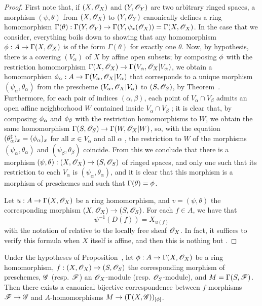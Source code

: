 \begin{proof}
First note that, if $(X,\mathscr{O}_X)$ and $(Y,\mathscr{O}_Y)$ are two arbitrary ringed spaces,
a morphism $(\psi,\theta)$ from $(X,\mathscr{O}_X)$ to $(Y,\mathscr{O}_Y)$ canonically defines a ring homomorphism $\Gamma(\theta):\Gamma(Y,\OO_Y)\to\Gamma(Y,\psi_*(\OO_X))=\Gamma(X,\OO_X)$.
In the case that we consider, everything boils down to showing that any homomorphism $\vphi:A\to\Gamma(X,\OO_X)$ is of the form $\Gamma(\theta)$ for exactly one $\theta$.
Now, by hypothesis, there is a covering $(V_\alpha)$ of $X$ by affine open subsets;
by composing $\phi$ with the restriction homomorphism $\Gamma(X,\OO_X)\to\Gamma(V_\alpha,\OO_X|V_\alpha)$, we obtain a homomorphism $\vphi_\alpha:A\to\Gamma(V_\alpha,\OO_X|V_\alpha)$ that corresponds to a unique morphism $(\psi_\alpha,\theta_\alpha)$ from the prescheme $(V_\alpha,\mathscr{O}_X|V_\alpha)$ to $(S,\mathscr{O}_S)$, by Theorem~.
Furthermore, for each pair of indices $(\alpha,\beta)$, each point of $V_\alpha\cap V_\beta$ admits an open affine neighborhood $W$ contained inside $V_\alpha\cap V_\beta$ ;
it is clear that, by composing $\phi_\alpha$ and $\phi_\beta$ with the restriction homomorphisms to $W$, we obtain the same homomorphism $\Gamma(S,\OO_S)\to\Gamma(W,\OO_X|W)$, so, with the equation $(\theta_\alpha^\sharp)_x=(\phi_\alpha)_x$ for all $x\in V_\alpha$ and all $\alpha$ , the restriction to $W$ of the morphisms $(\psi_\alpha,\theta_\alpha)$ and $(\psi_\beta,\theta_\beta)$ coincide.
From this we conclude that there is a morphism $(\psi,\theta):(X,\OO_X)\to(S,\OO_S)$ of ringed spaces, and only one such that its restriction to each $V_\alpha$ is $(\psi_\alpha,\theta_\alpha)$, and it is clear that this morphism is a morphism of preschemes and such that $\Gamma(\theta)=\phi$.

Let $u:A\to\Gamma(X,\OO_X)$ be a ring homomorphism, and $v=(\psi,\theta)$ the corresponding morphism $(X,\OO_X)\to(S,\OO_S)$.
For each $f\in A$, we have that
\begin{equation*}
  \label{1.2.2.4.1}
  \psi^{-1}(D(f))=X_{u(f)}
  \tag{2.2.4.1}
\end{equation*}
with the notation of  relative to the locally free sheaf $\mathscr{O}_X$.
In fact, it suffices to verify this formula when $X$ itself is affine, and then this is nothing but .
\end{proof}

\begin{prop}[2.2.5]
\label{1.2.2.5}
Under the hypotheses of Proposition~, let $\vphi:A\to\Gamma(X,\OO_X)$ be a ring homomorphism, $f:(X,\OO_X)\to(S,\OO_S)$ the corresponding morphism of preschemes, $\mathscr{G}$ (resp. $\mathscr{F}$) an $\mathscr{O}_X$-module (resp. $\mathscr{O}_S$-module), and $M=\Gamma(S,\mathscr{F})$.
Then there exists a canonical bijective
correspondence between $f$-morphisms $\sh{F}\to\sh{G}$  and $A$-homomorphisms $M\to(\Gamma(X,\sh{G}))_{[\vphi]}$.
\end{prop}

